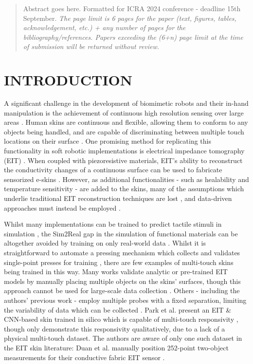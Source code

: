 \begin{abstract}

Abstract goes here. Formatted for ICRA 2024 conference - deadline 15th September. \textit{The page limit is 6 pages for the paper (text, figures, tables, acknowledgement, etc.) + any number of pages for the bibliography/references. Papers exceeding the (6+n) page limit at the time of submission will be returned without review.}
\end{abstract}


\section{INTRODUCTION}

A significant challenge in the development of biomimetic robots and their in-hand manipulation is the achievement of continuous high resolution sensing over large areas \cite{Shih2020, Liu2022}. Human skins are continuous and flexible, allowing them to conform to any objects being handled, and are capable of discriminating between multiple touch locations on their surface \cite{gellis1977two}. One promising method for replicating this functionality in soft robotic implementations is electrical impedance tomography (EIT) \cite{Barber1984, Cheney1999, Russo2017, xin2023electrical, Alian2023Soft}. When coupled with piezoresistive materials, EIT's ability to reconstruct the conductivity changes of a continuous surface can be used to fabricate sensorized e-skins \cite{Liu2020, Silvera2015Artificial}. However, as additional functionalities - such as healability and temperature sensitivity - are added to the skins, many of the assumptions which underlie traditional EIT reconstruction techniques are lost \cite{TerrynLearning, Georgopoulou2023sensorized, Abdelwahed2022Using}, and data-driven approaches must instead be employed \cite{Wang2015Optimized, wang2020deep}.

Whilst many implementations can be trained to predict tactile stimuli in simulation \cite{Park2022, Park2020ERT}, the Sim2Real gap in the simulation of functional materials can be altogether avoided by training on only real-world data \cite{Howison2021, hardman2023tactile}. Whilst it is straightforward to automate a pressing mechanism which collects and validates single-point presses for training \cite{TerrynLearning, Hardman20223D}, there are few examples of multi-touch skins being trained in this way. Many works validate analytic or pre-trained EIT models by manually placing multiple objects on the skins' surfaces, though this approach cannot be used for large-scale data collection \cite{Zhang2023, Soleimani2022Ionic, Zheng2018}. Others - including the authors' previous work - employ multiple probes with a fixed separation, limiting the variability of data which can be collected \cite{hardman2023tactile, Chen2023Novel, Jamshidi2023EIT}. Park et al. present an EIT \& CNN-based skin trained in silico which is capable of multi-touch responsivity \cite{Park2022}, though only demonstrate this responsivity qualitatively, due to a lack of a physical multi-touch dataset. The authors are aware of only one such dataset in the EIT skin literature: Duan et al. manually position 252-point two-object measurements for their conductive fabric EIT sensor \cite{Duan2019}.

